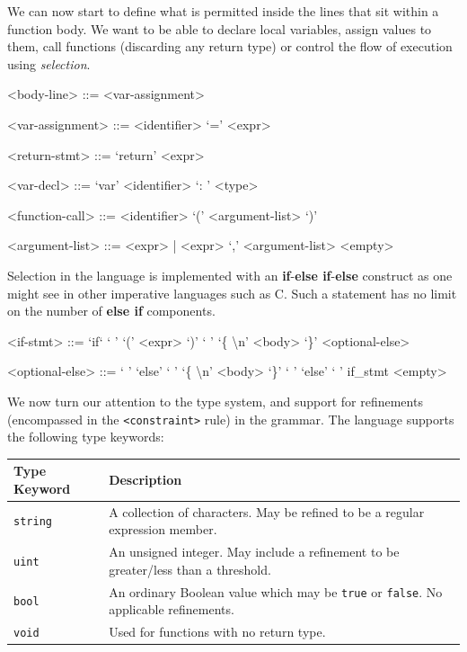 \documentclass[a4paper,openany,12pt]{book}
\begin{document}
We can now start to define what is permitted inside the lines that sit within a function body.
We want to be able to declare local variables, assign values to them, call functions (discarding any return type) or
control the flow of execution using \emph{selection}.

\begin{grammar}
    <body-line> ::= <var-assignment>

    <var-assignment> ::= <identifier> `=' <expr>

    <return-stmt> ::= `return' <expr>

    <var-decl> ::= `var' <identifier> `: ' <type>

    <function-call> ::= <identifier> `(' <argument-list> `)'

    <argument-list> ::= <expr> | <expr> `,' <argument-list>
    \alt <empty>
\end{grammar}

Selection in the language is implemented with an \textbf{if}-\textbf{else if}-\textbf{else} construct
as one might see in other imperative languages such as C.
Such a statement has no limit on the number of \textbf{else if} components.

\begin{grammar}
    <if-stmt> ::= `if` ` ' `(' <expr> `)' ` ' `\{ \textbackslash n' <body> `\}' <optional-else>

    <optional-else> ::= ` ' `else' ` ' `\{ \textbackslash n' <body> `\}' \alt ` ' `else' ` ' if_stmt \alt <empty>

\end{grammar}

We now turn our attention to the type system, and support for refinements (encompassed in the \texttt{<constraint>} rule) in the grammar.
The language supports the following type keywords:

\def\arraystretch{1.5}
\begin{table}[H]

    \centering
    \begin{tabular}[t]{|p{3cm}|p{8cm}|}
        \hline
        \rowcolor{id7-aubergine}
        {\color[HTML]{FFFFFF} \sffamily \textbf{Type Keyword}} & {\color[HTML]{FFFFFF} \sffamily \textbf{Description}} \\ \hline
        \texttt{string} & A collection of characters. May be refined to be a regular expression member. \\ \hline
        \texttt{uint} & An unsigned integer. May include a refinement to be greater/less than a threshold. \\ \hline
        \texttt{bool} & An ordinary Boolean value which may be \texttt{true} or \texttt{false}. No applicable refinements. \\ \hline
        \texttt{void} & Used for functions with no return type. \\ \hline
    \end{tabular}
\end{table}
\end{document}
